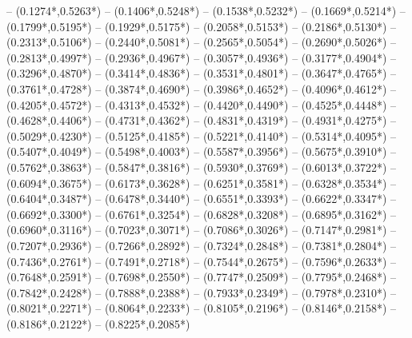 {	-- ({0.1274*\dx},{0.5263*\dy})
	-- ({0.1406*\dx},{0.5248*\dy})
	-- ({0.1538*\dx},{0.5232*\dy})
	-- ({0.1669*\dx},{0.5214*\dy})
	-- ({0.1799*\dx},{0.5195*\dy})
	-- ({0.1929*\dx},{0.5175*\dy})
	-- ({0.2058*\dx},{0.5153*\dy})
	-- ({0.2186*\dx},{0.5130*\dy})
	-- ({0.2313*\dx},{0.5106*\dy})
	-- ({0.2440*\dx},{0.5081*\dy})
	-- ({0.2565*\dx},{0.5054*\dy})
	-- ({0.2690*\dx},{0.5026*\dy})
	-- ({0.2813*\dx},{0.4997*\dy})
	-- ({0.2936*\dx},{0.4967*\dy})
	-- ({0.3057*\dx},{0.4936*\dy})
	-- ({0.3177*\dx},{0.4904*\dy})
	-- ({0.3296*\dx},{0.4870*\dy})
	-- ({0.3414*\dx},{0.4836*\dy})
	-- ({0.3531*\dx},{0.4801*\dy})
	-- ({0.3647*\dx},{0.4765*\dy})
	-- ({0.3761*\dx},{0.4728*\dy})
	-- ({0.3874*\dx},{0.4690*\dy})
	-- ({0.3986*\dx},{0.4652*\dy})
	-- ({0.4096*\dx},{0.4612*\dy})
	-- ({0.4205*\dx},{0.4572*\dy})
	-- ({0.4313*\dx},{0.4532*\dy})
	-- ({0.4420*\dx},{0.4490*\dy})
	-- ({0.4525*\dx},{0.4448*\dy})
	-- ({0.4628*\dx},{0.4406*\dy})
	-- ({0.4731*\dx},{0.4362*\dy})
	-- ({0.4831*\dx},{0.4319*\dy})
	-- ({0.4931*\dx},{0.4275*\dy})
	-- ({0.5029*\dx},{0.4230*\dy})
	-- ({0.5125*\dx},{0.4185*\dy})
	-- ({0.5221*\dx},{0.4140*\dy})
	-- ({0.5314*\dx},{0.4095*\dy})
	-- ({0.5407*\dx},{0.4049*\dy})
	-- ({0.5498*\dx},{0.4003*\dy})
	-- ({0.5587*\dx},{0.3956*\dy})
	-- ({0.5675*\dx},{0.3910*\dy})
	-- ({0.5762*\dx},{0.3863*\dy})
	-- ({0.5847*\dx},{0.3816*\dy})
	-- ({0.5930*\dx},{0.3769*\dy})
	-- ({0.6013*\dx},{0.3722*\dy})
	-- ({0.6094*\dx},{0.3675*\dy})
	-- ({0.6173*\dx},{0.3628*\dy})
	-- ({0.6251*\dx},{0.3581*\dy})
	-- ({0.6328*\dx},{0.3534*\dy})
	-- ({0.6404*\dx},{0.3487*\dy})
	-- ({0.6478*\dx},{0.3440*\dy})
	-- ({0.6551*\dx},{0.3393*\dy})
	-- ({0.6622*\dx},{0.3347*\dy})
	-- ({0.6692*\dx},{0.3300*\dy})
	-- ({0.6761*\dx},{0.3254*\dy})
	-- ({0.6828*\dx},{0.3208*\dy})
	-- ({0.6895*\dx},{0.3162*\dy})
	-- ({0.6960*\dx},{0.3116*\dy})
	-- ({0.7023*\dx},{0.3071*\dy})
	-- ({0.7086*\dx},{0.3026*\dy})
	-- ({0.7147*\dx},{0.2981*\dy})
	-- ({0.7207*\dx},{0.2936*\dy})
	-- ({0.7266*\dx},{0.2892*\dy})
	-- ({0.7324*\dx},{0.2848*\dy})
	-- ({0.7381*\dx},{0.2804*\dy})
	-- ({0.7436*\dx},{0.2761*\dy})
	-- ({0.7491*\dx},{0.2718*\dy})
	-- ({0.7544*\dx},{0.2675*\dy})
	-- ({0.7596*\dx},{0.2633*\dy})
	-- ({0.7648*\dx},{0.2591*\dy})
	-- ({0.7698*\dx},{0.2550*\dy})
	-- ({0.7747*\dx},{0.2509*\dy})
	-- ({0.7795*\dx},{0.2468*\dy})
	-- ({0.7842*\dx},{0.2428*\dy})
	-- ({0.7888*\dx},{0.2388*\dy})
	-- ({0.7933*\dx},{0.2349*\dy})
	-- ({0.7978*\dx},{0.2310*\dy})
	-- ({0.8021*\dx},{0.2271*\dy})
	-- ({0.8064*\dx},{0.2233*\dy})
	-- ({0.8105*\dx},{0.2196*\dy})
	-- ({0.8146*\dx},{0.2158*\dy})
	-- ({0.8186*\dx},{0.2122*\dy})
	-- ({0.8225*\dx},{0.2085*\dy})
}
